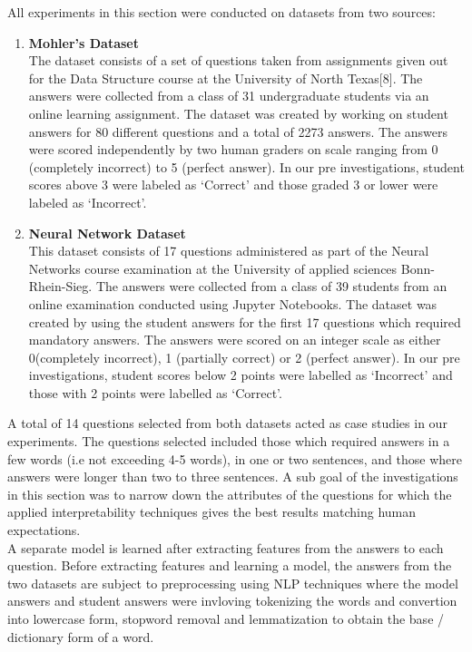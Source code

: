 \documentclass[letterpaper, 10 pt, conference]{ieeeconf}  %
\begin{document}
All experiments in this section were conducted on datasets from two sources:
\begin{enumerate}
\item \textbf{Mohler's Dataset}\\
The dataset consists of a set of questions taken from assignments given out for the Data Structure course at the University of North Texas[8]. The answers were collected from a class of 31 undergraduate students via an online learning assignment. The dataset was created by working on student answers for 80 different questions and a total of 2273 answers. The answers were scored independently by two human graders on scale ranging from 0 (completely incorrect) to 5 (perfect answer). In our pre investigations, student scores above 3 were labeled as `Correct' and those graded 3 or lower were labeled as `Incorrect'. 
\item \textbf{Neural Network Dataset}\\
This dataset consists of 17 questions administered as part of the Neural Networks course examination at the University of applied sciences Bonn-Rhein-Sieg. The answers were collected from a class of 39 students from an online examination conducted using Jupyter Notebooks. The dataset was created by using the student answers for the first 17 questions which required mandatory answers. The answers were scored on an integer scale as either 0(completely incorrect), 1 (partially correct) or 2 (perfect answer). In our pre investigations, student scores below 2 points were labelled as `Incorrect' and those with 2 points were labelled as `Correct'.
\end{enumerate}
A total of 14 questions selected from both datasets acted as case studies in our experiments. The questions selected included those which required answers in a few words (i.e not exceeding 4-5 words), in one or two sentences, and those where answers were longer than two to three sentences. A sub goal of the investigations in this section was to narrow down the attributes of the questions for which the applied interpretability techniques gives the best results matching human expectations.\\
A separate model is learned after extracting features from the answers to each question. Before extracting features and learning a model, the answers from the two datasets are subject to preprocessing using NLP techniques where the model answers and student answers were  invloving tokenizing the words and convertion into lowercase form, stopword removal and lemmatization to obtain the base / dictionary form of a word.
\end{document}

